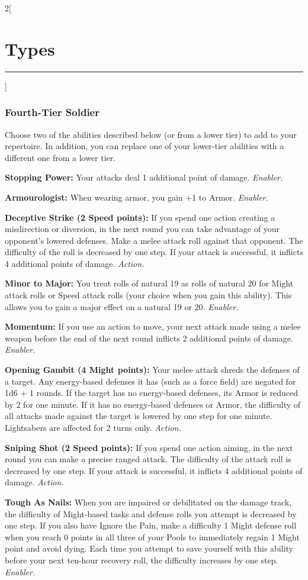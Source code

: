 \documentclass[a4paper,10pt,final]{book}
\newcommand{\HRule}{\rule{\linewidth}{0.5mm}} %
\newcommand{\newSection}[1]{\section*{#1} \addcontentsline{toc}{section}{#1} \label{sec:#1} \HRule}
\newcommand{\itemAbility}[2]{\textcolor{25gray}{\textbullet\textbf{ #1:}} {#2}\par}
\newcommand{\enabler}{\textit{ Enabler.}}
\newcommand{\action}{\textit{ Action.}}
\newenvironment{docsection}[1]
{
  \begin{multicols*}{2}[\newSection{#1}]
}
{
  \end{multicols*}
  \newpage
}
\begin{document}
\begin{docsection}{Types}
\subsubsection*{Fourth-Tier Soldier}
\label{subsub:soldierFourthTier}
Choose two of the abilities described below (or from a lower tier) to add to your repertoire. In addition, you can replace one of your lower-tier abilities with a different one from a lower tier.\par
\itemAbility{Stopping Power}{Your attacks deal 1
additional point of damage.\enabler}
\itemAbility{Armourologist}{When wearing
armor, you gain +1 to Armor.\enabler}
\itemAbility{Deceptive Strike (2 Speed points)}{If you spend one
action creating a misdirection or diversion,
in the next round you can take advantage
of your opponent’s lowered defenses. Make
a melee attack roll against that opponent.
The difficulty of the roll is decreased by one
step. If your attack is successful, it inflicts 4
additional points of damage.\action}
\itemAbility{Minor to Major}{You treat rolls of natural
19 as rolls of natural 20 for Might attack
rolls or Speed attack rolls (your choice when
you gain this ability). This allows you to gain
a major effect on a natural 19 or 20.\enabler}
\itemAbility{Momentum}{If you use an action to
move, your next attack made using a melee
weapon before the end of the next round
inflicts 2 additional points of damage.\enabler}
\itemAbility{Opening Gambit (4 Might points)}{Your
melee attack shreds the defenses of a
target. Any energy-based defenses it has
(such as a force field) are
negated for 1d6 + 1 rounds. If the target
has no energy-based defenses, its Armor
is reduced by 2 for one minute. If it has
no energy-based defenses or Armor, the
difficulty of all attacks made against the
target is lowered by one step for one
minute. Lightsabers are affected for 2 turns only.\action}
\itemAbility{Sniping Shot (2 Speed points)}{If you spend one
action aiming, in the next round you can
make a precise ranged attack. The difficulty
of the attack roll is decreased by one step.
If your attack is successful, it inflicts 4
additional points of damage.\action}
\itemAbility{Tough As Nails}{When you are impaired
or debilitated on the damage track, the
difficulty of Might-based tasks and defense rolls you attempt is decreased by one step.
If you also have Ignore the Pain, make a
difficulty 1 Might defense roll when you
reach 0 points in all three of your Pools
to immediately regain 1 Might point and
avoid dying. Each time you attempt to
save yourself with this ability before your
next ten-hour recovery roll, the difficulty
increases by one step.\enabler}


\end{docsection}
\end{document}
